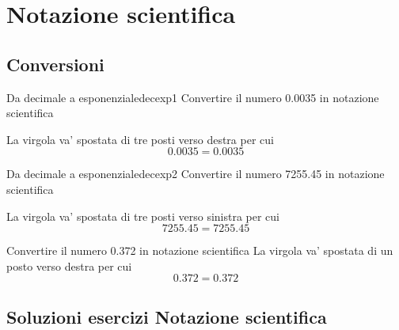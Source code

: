 \chapter{Notazione scientifica}
\label{cha:Notazionescietifica}
 
\section{Conversioni}


\begin{esempiot}{Da decimale a esponenziale}{decexp1}
	Convertire il numero \num{0.0035} in notazione scientifica
\end{esempiot}
La virgola va' spostata di tre posti verso destra per cui
\[\num{0.0035}=\num[scientific-notation=true]{0.0035}\]
\begin{esempiot}{Da decimale a esponenziale}{decexp2}
	Convertire il numero \num{7255.45} in notazione scientifica
\end{esempiot}
La virgola va' spostata di tre posti verso sinistra per cui
\[\num{7255.45}=\num[scientific-notation=true]{7255.45}\]
\tcbstartrecording

\begin{exercise}
	Convertire il numero \num{0.372} in notazione scientifica
	\tcblower
	La virgola va' spostata di un posto verso destra per cui
	\[\num{0.372}=\num[scientific-notation=true]{0.372}\]
\end{exercise}
\tcbstoprecording
 \newpage
\section{Soluzioni esercizi Notazione scientifica}
\tcbinputrecords